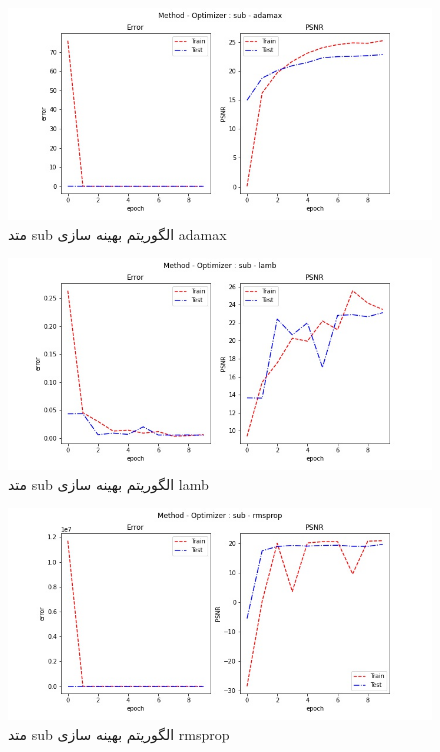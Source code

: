  \begin{figure}[!h] 
       \centering 
       \includegraphics[width=160mm]{./chapter3/images/error-psnr-sub-adamax.jpg}
       \caption{متد sub الگوریتم بهینه سازی adamax}
       \label{fig:error-psnr-sub-adamax}
 \end{figure}
 \begin{figure}[!h] 
       \centering 
       \includegraphics[width=160mm]{./chapter3/images/error-psnr-sub-lamb.jpg}
       \caption{متد sub الگوریتم بهینه سازی lamb}
       \label{fig:error-psnr-sub-lamb}
 \end{figure}
 \begin{figure}[!h] 
       \centering 
       \includegraphics[width=160mm]{./chapter3/images/error-psnr-sub-rmsprop.jpg}
       \caption{متد sub الگوریتم بهینه سازی rmsprop}
       \label{fig:error-psnr-sub-rmsprop}
 \end{figure}
